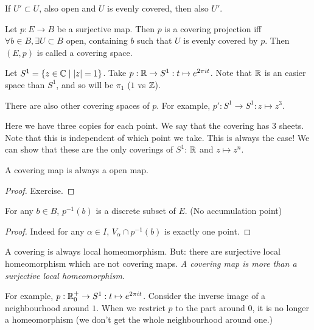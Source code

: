 \begin{remark}
    If $U' \subset U$, also open and $U$ is evenly covered, then also $U'$.
\end{remark}
\begin{definition}
    Let $p: E \to  B$ be a surjective map.
    Then $p$ is a covering projection iff $\forall b \in B, \exists  U \subset B$ open, containing $b$ such that $U$ is evenly covered by $p$. 
    Then $(E, p)$ is called a covering space.
\end{definition}
\begin{eg}
    Let $S^{1} = \{ z \in \mathbb{C}  \mid  |z| = 1\}$.
    Take $p: \mathbb{R} \to  S^{1}: t \mapsto  e^{2 \pi i t}$.
    Note that $\mathbb{R}$ is an easier space than $S^{1}$, and so will be $\pi_1$ ($1$ vs  $\mathbb{Z}$).

    There are also other covering spaces of $p$.
    For example, $p' : S^{1} \to  S^{1} : z \mapsto z^3$.

    Here we have three copies for each point. We say that the covering has $3$ sheets.
    Note that this is independent of which point we take. This is always the case!
    We can show that these are the only coverings of $S^{1}$: $\mathbb{R}$ and  $z \mapsto  z^{n}$.
\end{eg}

\begin{prop}
    A covering map is always a open map.
\end{prop}
\begin{proof}
    Exercise.
\end{proof}
\begin{prop}
    For any $b \in B$, $p^{-1}(b)$ is a discrete subset of $E$. (No accumulation point)
\end{prop}
\begin{proof}
    Indeed for any $\alpha \in I$, $V_\alpha \cap p^{-1}(b)$ is exactly one point.
\end{proof}

\begin{remark}
A covering is always local homeomorphism.
But: there are surjective local homeomorphism which are not covering maps.
\emph{A covering map is more than a surjective local homeomorphism}.

For example, $p: \mathbb{R}_0^{+} \to  S^{1}: t \mapsto  e^{2\pi i t}$. Consider the inverse image of a neighbourhood around $1$. When we restrict $p$ to the part around $0$, it is no longer a homeomorphism (we don't get the whole neighbourhood around one.)
\end{remark}

